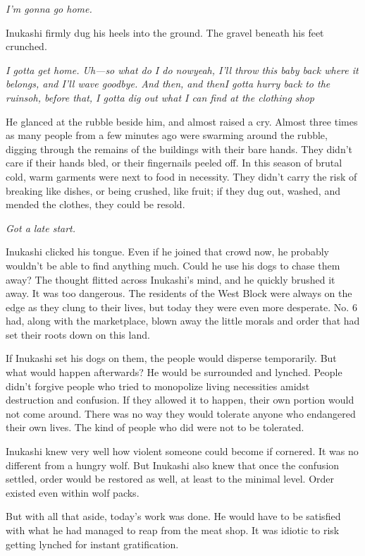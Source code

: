 \emph{I'm gonna go home.}

Inukashi firmly dug his heels into the ground. The gravel beneath his
feet crunched.

\emph{I gotta get home. Uh---so what do I do now\el yeah, I'll throw this baby
back where it belongs, and I'll wave goodbye. And then, and then\el I
gotta hurry back to the ruins\el oh, before that, I gotta dig out what I
can find at the clothing shop\el }

He glanced at the rubble beside him, and almost raised a cry. Almost
three times as many people from a few minutes ago were swarming around
the rubble, digging through the remains of the buildings with their bare
hands. They didn't care if their hands bled, or their fingernails peeled
off. In this season of brutal cold, warm garments were next to food in
necessity. They didn't carry the risk of breaking like dishes, or being
crushed, like fruit; if they dug out, washed, and mended the clothes,
they could be resold.

\emph{Got a late start.}

Inukashi clicked his tongue. Even if he joined that crowd now, he
probably wouldn't be able to find anything much. Could he use his dogs
to chase them away? The thought flitted across Inukashi's mind, and he
quickly brushed it away. It was too dangerous. The residents of the West
Block were always on the edge as they clung to their lives, but today
they were even more desperate. No. 6 had, along with the marketplace,
blown away the little morals and order that had set their roots down on
this land.

If Inukashi set his dogs on them, the people would disperse temporarily.
But what would happen afterwards? He would be surrounded and lynched.
People didn't forgive people who tried to monopolize living necessities
amidst destruction and confusion. If they allowed it to happen, their
own portion would not come around. There was no way they would tolerate
anyone who endangered their own lives. The kind of people who did were
not to be tolerated.

Inukashi knew very well how violent someone could become if cornered. It
was no different from a hungry wolf. But Inukashi also knew that once
the confusion settled, order would be restored as well, at least to the
minimal level. Order existed even within wolf packs.

But with all that aside, today's work was done. He would have to be
satisfied with what he had managed to reap from the meat shop. It was
idiotic to risk getting lynched for instant gratification.

